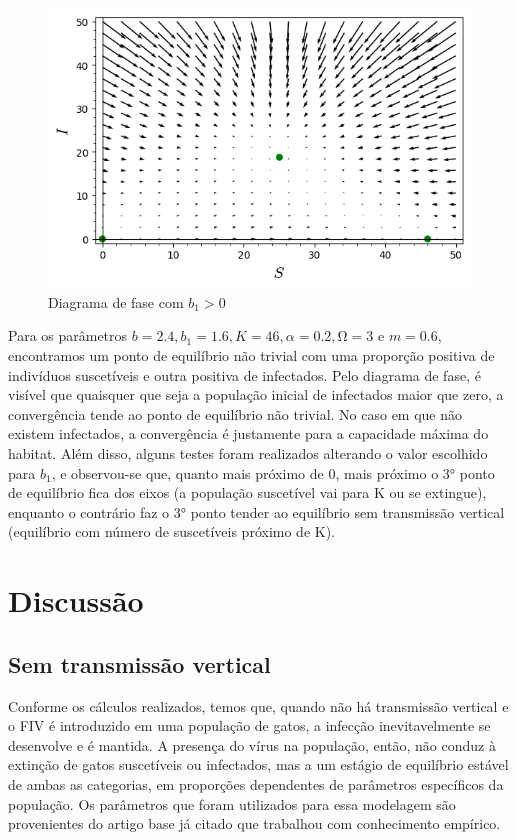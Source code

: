 \documentclass{article}
\begin{document}
\begin{figure}[!h]
    \centering
      \includegraphics[width=14cm]{imagens/b1mzs.png}
    \caption{Diagrama de fase com $b_1>0$}
    \label{fig:my_label}
\end{figure}
    
\newpage
\noindent Para os parâmetros $b = 2.4,b_1=1.6, K = 46, α = 0.2, Ω = 3 \mbox{ e } m = 0.6$, encontramos um ponto de equilíbrio não trivial com uma proporção positiva de indivíduos suscetíveis e outra positiva de infectados. Pelo diagrama de fase, é visível que quaisquer que seja a população inicial de infectados maior que zero, a convergência tende ao ponto de equilíbrio não trivial. No caso em que não existem infectados, a convergência é justamente para a capacidade máxima do habitat. Além disso, alguns testes foram realizados alterando o valor escolhido para $b_1$, e observou-se que, quanto mais próximo de 0, mais próximo o 3° ponto de equilíbrio fica dos eixos (a população suscetível vai para K ou se extingue), enquanto o contrário faz o 3° ponto tender ao equilíbrio sem transmissão vertical (equilíbrio com número de suscetíveis próximo de K).

\newpage
\section{Discussão}
\subsection{Sem transmissão vertical}
Conforme os cálculos realizados, temos que, quando não há transmissão vertical e o FIV é introduzido em uma população de gatos, a infecção inevitavelmente se desenvolve e é mantida. A presença do vírus na população, então, não conduz à extinção de gatos suscetíveis ou infectados, mas a um estágio de equilíbrio estável de ambas as categorias, em proporções dependentes de parâmetros específicos da população. Os parâmetros que foram utilizados para essa modelagem são provenientes do artigo base já citado que trabalhou com conhecimento empírico. \\
\end{document}
